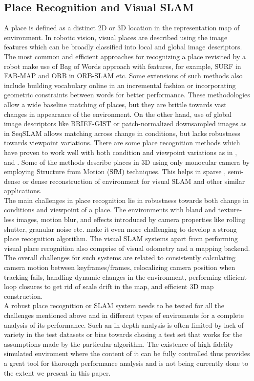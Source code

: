 \subsection{Place Recognition and Visual SLAM}
A place is defined as a distinct 2D or 3D location in the representation map of environment. In robotic vision, visual places are described using the image features which can be broadly classified into local and global image descriptors. The most common and efficient approaches for recognizing a place revisited by a robot make use of Bag of Words approach with features, for example, SURF in FAB-MAP \cite{Cummins2010} and ORB in ORB-SLAM \cite{Montiel2015} etc. Some extensions of such methods also include building vocabulary online in an incremental fashion or incorporating geometric constraints between words for better performance. These methodologies allow a wide baseline matching of places, but they are brittle towards vast changes in appearance of the environment. On the other hand, use of global image descriptors like BRIEF-GIST \cite{Sunderhauf2011} or patch-normalized downsampled images as in SeqSLAM \cite{Milford2012} allows matching across change in conditions, but lacks robustness towards viewpoint variations. There are some place recognition methods which have proven to work well with both condition and viewpoint variations as in \cite{McManus2014}, \cite{Milford2008} and \cite{Niko2015}. Some of the methods describe places in 3D using only monocular camera by employing Structure from Motion (SfM) techniques. This helps in sparse \cite{Montiel2015}, semi-dense \cite{Engel2014lsd, Mur-Artal2015b} or dense \cite{Newcombe2011} reconstruction of environment for visual SLAM and other similar applications.
\\
The main challenges in place recognition lie in robustness towards both change in conditions and viewpoint of a place. The environments with bland and texture-less images, motion blur, and effects introduced by camera properties like rolling shutter, granular noise etc. make it even more challenging to develop a strong place recognition algorithm.
The visual SLAM systems apart from performing visual place recognition also comprise of visual odometry and a mapping backend. The overall challenges for such systems are related to consistently calculating camera motion between keyframes/frames, relocalizing camera position when tracking fails, handling dynamic changes in the environment, performing efficient loop closures to get rid of scale drift in the map, and efficient 3D map construction.
\\
A robust place recognition or SLAM system needs to be tested for all the challenges mentioned above and in different types of enviroments for a complete analysis of its performance. Such an in-depth analysis is often limited by lack of variety in the test datasets or bias towards chosing a test set that works for the assumptions made by the particular algorithm. The existence of high fidelity simulated enviroment where the content of it can be fully controlled thus provides a great tool for thorough performance analysis and is not being currently done to the extent we present in this paper.